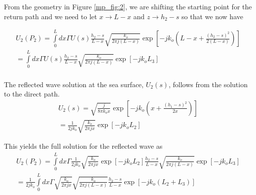 From the geometry in Figure \ref{mp_fig:2}, we are shifting the starting point for the return path and we need to let $x \rightarrow L-x$ and $z \rightarrow h_2-s$ so that we now have

\begin{equation}
\begin{gathered}
U_2(P_2) = \int\limits_{0}^{L}dx\Gamma U(s)\frac{h_2-s}{L-x}\sqrt{\frac{k_o}{2\pi j (L-x)}}\exp\left[-jk_o\left(L-x +\frac{(h_2-s)^2}{2(L-x)} \right) \right] \\
= \int\limits_{0}^{L}dx\Gamma U(s)\frac{h_2-s}{L-x}\sqrt{\frac{k_o}{2\pi j (L-x)}}\exp\left[-jk_oL_3\right] \\
\end{gathered}
\label{mp_eq:11aag}
\end{equation}
\renewcommand{\baselinestretch}{2} \small\normalsize

The reflected wave solution at the sea surface, $U_2(s)$, follows from the solution to the direct path.
\begin{equation}
\begin{gathered}
U_2(s) = \sqrt{\frac{j}{8\pi k_ox}}\exp\left[-jk_o\left(x + \frac{(h_1-s)^2}{2x}\right) \right]\\
= \frac{1}{2jk_o}\sqrt{\frac{k_o}{2\pi jx}}\exp\left[-jk_oL_2\right]
\end{gathered}
\label{mp_eq:11ae}
\end{equation}
\renewcommand{\baselinestretch}{2} \small\normalsize

This yields the full solution for the reflected wave as 
\begin{equation}
\begin{gathered}
U_2(P_2) = \int\limits_{0}^{L}dx\Gamma \frac{1}{2jk_o}\sqrt{\frac{k_o}{2\pi jx}}\exp\left[-jk_oL_2\right]\frac{h_2-s}{L-x}\sqrt{\frac{k_o}{2\pi j (L-x)}}\exp\left[-jk_oL_3 \right]  \\
= \frac{1}{2jk_o}\int\limits_{0}^{L}dx\Gamma \sqrt{\frac{k_o}{2\pi jx}}\sqrt{\frac{k_o}{2\pi j (L-x)}}\frac{h_2-s}{L-x}\exp\left[-jk_o\left( L_2 + L_3\right) \right]  \\
\label{mp_eq:12g}
\end{gathered}
\end{equation}
\renewcommand{\baselinestretch}{2} \small\normalsize

